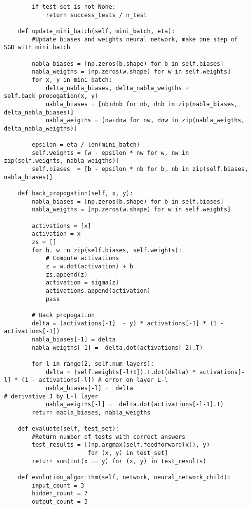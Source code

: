 \begin{lstlisting}
        if test_set is not None:
            return success_tests / n_test

    def update_mini_batch(self, mini_batch, eta):
        #Update biases and weights neural network, make one step of SGD with mini batch
        
        nabla_biases = [np.zeros(b.shape) for b in self.biases]
        nabla_weigths = [np.zeros(w.shape) for w in self.weights]
        for x, y in mini_batch:
            delta_nabla_biases, delta_nabla_weigths = self.back_propogation(x, y)
            nabla_biases = [nb+dnb for nb, dnb in zip(nabla_biases, delta_nabla_biases)]
            nabla_weigths = [nw+dnw for nw, dnw in zip(nabla_weigths, delta_nabla_weigths)]
            
        epsilon = eta / len(mini_batch)
        self.weights = [w - epsilon * nw for w, nw in zip(self.weights, nabla_weigths)]
        self.biases  = [b - epsilon * nb for b, nb in zip(self.biases,  nabla_biases)]
            
    def back_propogation(self, x, y):
        nabla_biases = [np.zeros(b.shape) for b in self.biases]
        nabla_weigths = [np.zeros(w.shape) for w in self.weights]

        activations = [x]
        activation = x
        zs = []
        for b, w in zip(self.biases, self.weights):
            # Compute activations
            z = w.dot(activation) + b
            zs.append(z)
            activation = sigma(z)
            activations.append(activation)
            pass

        # Back propogation
        delta = (activations[-1]  - y) * activations[-1] * (1 - activations[-1]) 
        nabla_biases[-1] = delta 
        nabla_weigths[-1] =  delta.dot(activations[-2].T)

        for l in range(2, self.num_layers):
            delta = (self.weights[-l+1]).T.dot(delta) * activations[-l] * (1 - activations[-l]) # error on layer L-l
            nabla_biases[-l] =  delta                                                           # derivative J by L-l layer
            nabla_weigths[-l] =  delta.dot(activations[-l-1].T)
        return nabla_biases, nabla_weigths
    
    def evaluate(self, test_set):
        #Return number of tests with correct answers
        test_results = [(np.argmax(self.feedforward(x)), y)
                        for (x, y) in test_set]
        return sum(int(x == y) for (x, y) in test_results)

    def evolution_algorithm(self, network, neural_network_child):
        input_count = 3
        hidden_count = 7
        output_count = 3


\end{lstlisting}
